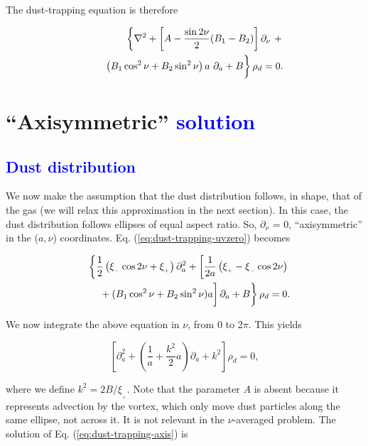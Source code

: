 \documentclass[apj]{emulateapj}
\def\white#1{\textcolor{white}{#1}}
\def\blue#1{\textcolor{blue}{ #1}}
\newcommand{\Laplace}{\nabla^2}
\newcommand{\Eq}[1]{Eq. (\ref{#1})}
\newcommand{\eq}[1]{\Eq{#1}}
\newcommand{\beq}{\begin{equation}}
\newcommand{\eeq}{\end{equation}}
\newcommand{\beqn}{\begin{eqnarray}}
\newcommand{\eeqn}{\end{eqnarray}}
\newcommand{\epsp}{\xi_{_{+}}}
\newcommand{\epsm}{\xi_{_{-}}}
\begin{document}
The dust-trapping equation is therefore 

\beqn 
&& \left\{ \Laplace{} + \left[A - \frac{\sin2\nu}{2}  (B_1 - B_2)\right]\partial_\nu \ +  \right.  \nonumber\\
&& \left. \white{\frac{1}{1}}\left( B_1 \cos^2\nu   + B_2\sin^2\nu
  \right) a \ \partial_a  + B \right\} \rho_d = 0. \label{eq:dust-trapping-uvzero}
\eeqn


\section{``Axisymmetric'' \blue{solution}}
\label{sect:axisymmetric}

\blue{\subsection{Dust distribution}}

We now make the assumption that the dust distribution follows, in shape, that of
the gas (we will relax this approximation in the next section). In this case, the
dust distribution follows ellipses of equal aspect ratio. So,
$\partial_\nu$ = 0, ``axisymmetric'' in the ($a,\nu$)
coordinates. \eq{eq:dust-trapping-uvzero} becomes

\beqn
&&\left\{\frac{1}{2}\left(\epsm \cos 2\nu +\epsp\right) \partial^2_a  +  \left[\frac{1}{2a}\left( \epsp - \epsm\cos 2\nu\right) \right.\right. \nonumber\\
&&\left.\left.\white{\frac{1}{1}}+ (B_1\cos^2\nu +  B_2\sin^2\nu)a\right] \partial_a  + B\right\} \rho_d = 0. \label{eq:axi}
\eeqn

We now integrate the above equation in $\nu$, from 0 to 2$\pi$. This yields

\beq\label{eq:dust-trapping-axis}
\left[\partial^2_a  +  \left(\frac{1}{a} +  \frac{k^2}{2}a\right) \partial_a  + k^2\right]\rho_d = 0, 
\eeq

\noindent where we define $k^2=2B/\epsp$. Note that the parameter $A$
is absent because it represents advection by the vortex, which only
move dust particles along the same ellipse, not across it. It is
not relevant in the $\nu$-averaged problem. The solution of
\eq{eq:dust-trapping-axis} is 
\end{document}

